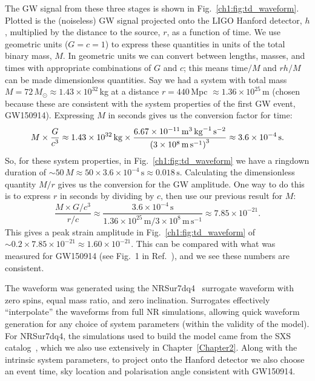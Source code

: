 The GW signal from these three stages is shown in Fig.~\ref{ch1:fig:td_waveform}.
Plotted is the (noiseless) GW signal projected onto the LIGO Hanford detector, $h$, multiplied by the distance to the source, $r$, as a function of time. 
We use geometric units ($G = c = 1$) to express these quantities in units of the total binary mass, $M$. 
In geometric units we can convert between lengths, masses, and times with appropriate combinations of $G$ and $c$; this means $\mathrm{time}/M$ and $rh/M$ can be made dimensionless quantities. 
Say we had a system with total mass $M = 72\, M_\odot \approx 1.43 \times 10^{32}\,$kg at a distance $r = 440\,$Mpc $\approx 1.36 \times 10^{25}\,$m (chosen because these are consistent with the system properties of the first GW event, GW150914). 
Expressing $M$ in seconds gives us the conversion factor for time:
\begin{equation}
    M \times \frac{G}{c^3} \approx 1.43 \times 10^{32}\, \mathrm{kg} \times \frac{6.67 \times 10^{-11}\, \mathrm{m}^3\, \mathrm{kg}^{-1}\, \mathrm{s}^{-2}}{\qty(3 \times 10^8\, \mathrm{m}\, \mathrm{s}^{-1})^3} \approx 3.6 \times 10^{-4}\, \mathrm{s}.
\end{equation}
So, for these system properties, in Fig.~\ref{ch1:fig:td_waveform} we have a ringdown duration of $\sim 50\, M \approx 50 \times 3.6 \times 10^{-4}\, \mathrm{s} \approx 0.018\, \mathrm{s}$. 
Calculating the dimensionless quantity $M/r$ gives us the conversion for the GW amplitude. 
One way to do this is to express $r$ in seconds by dividing by $c$, then use our previous result for $M$:
\begin{equation}
    \frac{M \times G/c^3}{r/c} \approx \frac{3.6 \times 10^{-4}\, \mathrm{s}}{1.36 \times 10^{25}\, \mathrm{m}/3 \times 10^8\, \mathrm{m}\, \mathrm{s}^{-1}} \approx 7.85 \times 10^{-21}.
\end{equation}
This gives a peak strain amplitude in Fig.~\ref{ch1:fig:td_waveform} of $\sim 0.2 \times 7.85 \times 10^{-21} \approx 1.60 \times 10^{-21}$. 
This can be compared with what was measured for GW150914 (see Fig.~1 in Ref.~\cite{LIGOScientific:2016aoc}), and we see these numbers are consistent.

The waveform was generated using the NRSur7dq4~\cite{Varma:2019csw} surrogate waveform with zero spins, equal mass ratio, and zero inclination. 
Surrogates effectively ``interpolate'' the waveforms from full NR simulations, allowing quick waveform generation for any choice of system parameters (within the validity of the model). 
For NRSur7dq4, the simulations used to build the model came from the SXS catalog~\cite{Boyle:2019kee}, which we also use extensively in Chapter~\ref{Chapter2}. 
Along with the intrinsic system parameters, to project onto the Hanford detector we also choose an event time, sky location and polarisation angle consistent with GW150914.

